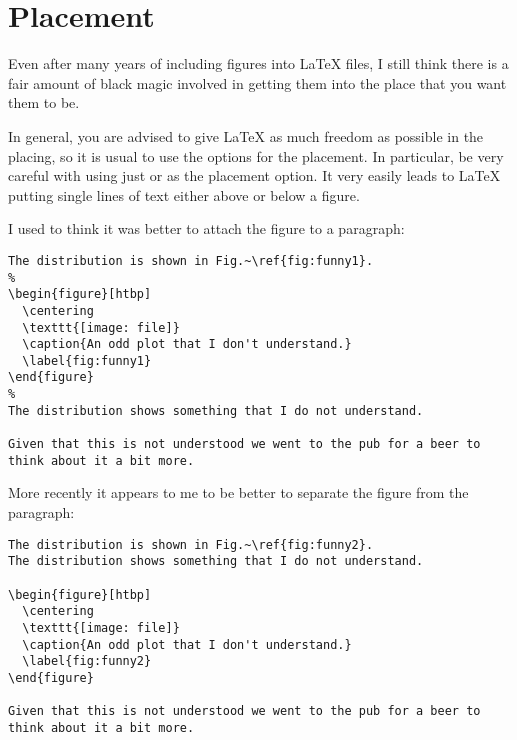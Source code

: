\section{Placement}
\label{sec:fig:placement}

Even after many years of including figures into \LaTeX{} files, I
still think there is a fair amount of black magic involved in getting
them into the place that you want them to be.

In general, you are advised to give \LaTeX{} as much freedom as
possible in the placing, so it is usual to use the options
\Option{[htbp]} for the placement. In particular, be very careful with
using just \Option{[h]} or \Option{[H]} as the placement option. It very
easily leads to \LaTeX{} putting single lines of text either above or
below a figure.

I used to think it was better to attach the figure to a paragraph:
\begin{verbatim}
The distribution is shown in Fig.~\ref{fig:funny1}.
%
\begin{figure}[htbp]
  \centering
  \texttt{[image: file]}
  \caption{An odd plot that I don't understand.}
  \label{fig:funny1}
\end{figure}
%
The distribution shows something that I do not understand.

Given that this is not understood we went to the pub for a beer to
think about it a bit more.
\end{verbatim}

More recently it appears to me to be better to separate the figure
from the paragraph:
\begin{verbatim}
The distribution is shown in Fig.~\ref{fig:funny2}.
The distribution shows something that I do not understand.

\begin{figure}[htbp]
  \centering
  \texttt{[image: file]}
  \caption{An odd plot that I don't understand.}
  \label{fig:funny2}
\end{figure}

Given that this is not understood we went to the pub for a beer to
think about it a bit more.
\end{verbatim}

